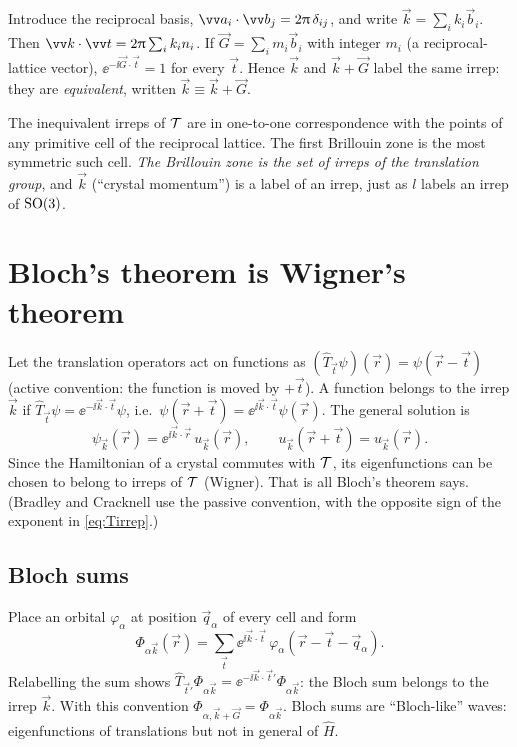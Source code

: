 Introduce the reciprocal basis, $\vec{a}_i\cdot\vec{b}_j=2\cpi\,\delta_{ij}$, and write
$\vec{k}=\sum_ik_i\vec{b}_i$. Then $\vec{k}\cdot\vec{t}=2\cpi\sum_ik_in_i$. If
$\vec{G}=\sum_im_i\vec{b}_i$ with integer $m_i$ (a reciprocal-lattice vector),
$\ee^{-\ii\vec{G}\cdot\vec{t}}=1$ for every $\vec{t}$. Hence $\vec{k}$ and $\vec{k}+\vec{G}$
label the same irrep: they are \emph{equivalent}, written $\vec{k}\equiv\vec{k}+\vec{G}$.

\begin{keyresult}
The inequivalent irreps of $\mathcal{T}$ are in one-to-one correspondence with the points
of any primitive cell of the reciprocal lattice. The first Brillouin zone is the
most symmetric such cell. \emph{The Brillouin zone is the set of irreps of the
translation group}, and $\vec{k}$ (``crystal momentum'') is a label of an irrep, just as
$l$ labels an irrep of $\mathrm{SO}(3)$.
\end{keyresult}

\section{Bloch's theorem is Wigner's theorem}

Let the translation operators act on functions as $(\hat{T}_{\vec{t}}\psi)(\vec{r})=
\psi(\vec{r}-\vec{t})$ (active convention: the function is moved by $+\vec{t}$). A
function belongs to the irrep $\vec{k}$ if
$\hat{T}_{\vec{t}}\psi=\ee^{-\ii\vec{k}\cdot\vec{t}}\psi$, i.e.\
$\psi(\vec{r}+\vec{t})=\ee^{\ii\vec{k}\cdot\vec{t}}\psi(\vec{r})$. The general solution is
\begin{equation}
\psi_{\vec{k}}(\vec{r})=\ee^{\ii\vec{k}\cdot\vec{r}}\,u_{\vec{k}}(\vec{r}),\qquad
u_{\vec{k}}(\vec{r}+\vec{t})=u_{\vec{k}}(\vec{r}).
\end{equation}
Since the Hamiltonian of a crystal commutes with $\mathcal{T}$, its eigenfunctions can be
chosen to belong to irreps of $\mathcal{T}$ (Wigner). That is all Bloch's theorem says.
(Bradley and Cracknell use the passive convention, with the opposite sign of the
exponent in \eqref{eq:Tirrep}.)

\subsection{Bloch sums}
Place an orbital $\varphi_\alpha$ at position $\vec{q}_\alpha$ of every cell and form
\begin{equation}\label{eq:blochsum}
\Phi_{\alpha\vec{k}}(\vec{r})=\sum_{\vec{t}}\ee^{\ii\vec{k}\cdot\vec{t}}\,
\varphi_\alpha(\vec{r}-\vec{t}-\vec{q}_\alpha).
\end{equation}
Relabelling the sum shows $\hat{T}_{\vec{t}'}\Phi_{\alpha\vec{k}}=\ee^{-\ii\vec{k}\cdot\vec{t}'}
\Phi_{\alpha\vec{k}}$: the Bloch sum belongs to the irrep $\vec{k}$. With this
convention $\Phi_{\alpha,\vec{k}+\vec{G}}=\Phi_{\alpha\vec{k}}$. Bloch sums are
``Bloch-like'' waves: eigenfunctions of translations but not in general of $\hat{H}$.

